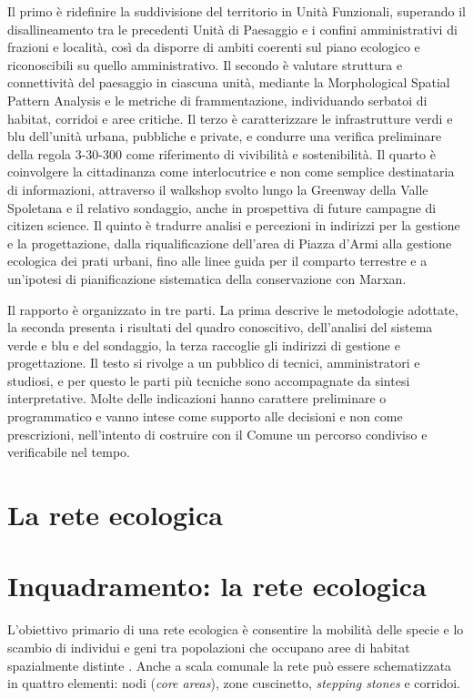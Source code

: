 \documentclass[
  a4paper,
]{book}
\begin{document}
Il primo è ridefinire la suddivisione del territorio in Unità Funzionali, superando il disallineamento tra le precedenti Unità di Paesaggio e i confini amministrativi di frazioni e località, così da disporre di ambiti coerenti sul piano ecologico e riconoscibili su quello amministrativo.
Il secondo è valutare struttura e connettività del paesaggio in ciascuna unità, mediante la Morphological Spatial Pattern Analysis e le metriche di frammentazione, individuando serbatoi di habitat, corridoi e aree critiche.
Il terzo è caratterizzare le infrastrutture verdi e blu dell'unità urbana, pubbliche e private, e condurre una verifica preliminare della regola 3-30-300 come riferimento di vivibilità e sostenibilità.
Il quarto è coinvolgere la cittadinanza come interlocutrice e non come semplice destinataria di informazioni, attraverso il walkshop svolto lungo la Greenway della Valle Spoletana e il relativo sondaggio, anche in prospettiva di future campagne di citizen science.
Il quinto è tradurre analisi e percezioni in indirizzi per la gestione e la progettazione, dalla riqualificazione dell'area di Piazza d'Armi alla gestione ecologica dei prati urbani, fino alle linee guida per il comparto terrestre e a un'ipotesi di pianificazione sistematica della conservazione con Marxan.

Il rapporto è organizzato in tre parti.
La prima descrive le metodologie adottate, la seconda presenta i risultati del quadro conoscitivo, dell'analisi del sistema verde e blu e del sondaggio, la terza raccoglie gli indirizzi di gestione e progettazione.
Il testo si rivolge a un pubblico di tecnici, amministratori e studiosi, e per questo le parti più tecniche sono accompagnate da sintesi interpretative.
Molte delle indicazioni hanno carattere preliminare o programmatico e vanno intese come supporto alle decisioni e non come prescrizioni, nell'intento di costruire con il Comune un percorso condiviso e verificabile nel tempo.

\section{La rete ecologica}\label{la-rete-ecologica}

\section{Inquadramento: la rete ecologica}\label{inquadramento-la-rete-ecologica}

L'obiettivo primario di una rete ecologica è consentire la mobilità delle specie e lo scambio di individui e geni tra popolazioni che occupano aree di habitat spazialmente distinte \citep{battisti2004}.
Anche a scala comunale la rete può essere schematizzata in quattro elementi: nodi (\emph{core areas}), zone cuscinetto, \emph{stepping stones} e corridoi.
\end{document}
